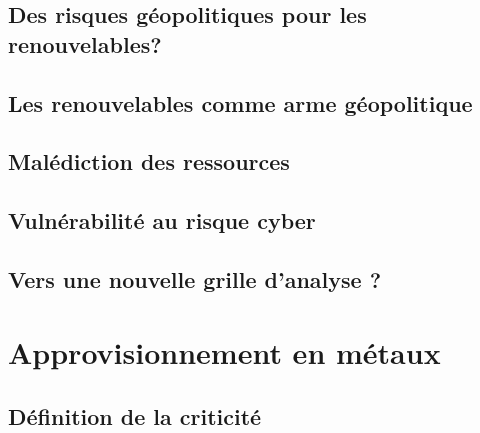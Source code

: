 \documentclass{article}
\begin{document}
\begin{refsection}
\section{Des risques géopolitiques pour les renouvelables?}

    
    \subsection{Les renouvelables comme arme géopolitique}
    \label{section:arme}
    
    \subsection{Malédiction des ressources}
    \label{section:malédiction}
    
    \subsection{Vulnérabilité au risque cyber}
    \label{section:cyber}
    
    \subsection{Vers une nouvelle grille d'analyse ?}
    \label{section:analyse}
    
    \clearpage
    \printbibliography
    \clearpage
\end{refsection}
\section{Approvisionnement en métaux}
\label{section:approvisionnement}
    
    \subsection{Définition de la criticité}
    
    \label{section:criticité}
\clearpage
\end{document}
